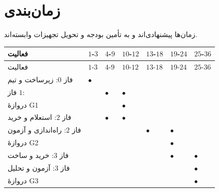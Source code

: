 \section{زمان‌بندی}
زمان‌ها پیشنهادی‌اند و به تأمین بودجه و تحویل تجهیزات وابسته‌اند.
\begin{longtable}{R{5.08cm}C{1.47cm}C{1.47cm}C{1.47cm}C{1.47cm}C{1.47cm}C{1.47cm}}
\toprule {} فعالیت & $1$-$3$ & $4$-$9$ & $10$-$12$ & $13$-$18$ & $19$-$24$ & $25$-$36$ \\ \midrule
\endfirsthead
\toprule {} فعالیت & $1$-$3$ & $4$-$9$ & $10$-$12$ & $13$-$18$ & $19$-$24$ & $25$-$36$ \\ \midrule
\endhead
فاز $0$: زیرساخت و تیم & $\bullet$ & & & & & \\
فاز $1$:  & & $\bullet$ & $\bullet$ & & & \\
دروازهٔ G1 & & & $\bullet$ & & & \\
فاز $2$: استعلام و خرید & & $\bullet$ & $\bullet$ & & & \\
فاز $2$: راه‌اندازی و آزمون & & & & $\bullet$ & $\bullet$ & \\
دروازهٔ G2 & & & & & $\bullet$ & \\
فاز $3$: خرید و ساخت & & & & & $\bullet$ & $\bullet$ \\
فاز $3$: آزمون و تحلیل & & & & & & $\bullet$ \\
دروازهٔ G3 & & & & & & $\bullet$ \\
\bottomrule\end{longtable}

